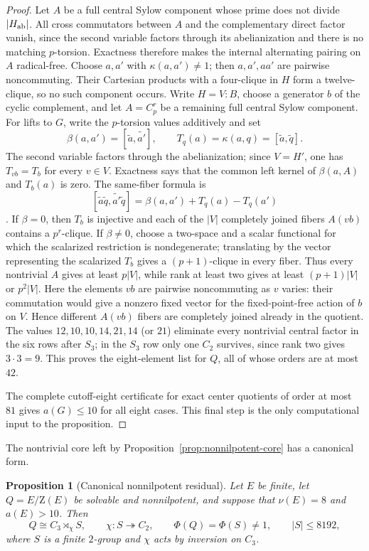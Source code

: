 \documentclass[11pt]{article}
\newtheorem{proposition}[theorem]{Proposition}
\theoremstyle{remark}
\newcommand{\nuG}{\nu}
\newcommand{\aG}{a}
\newcommand{\Z}{\mathrm Z}
\begin{document}
\begin{proof}
Let $A$ be a full central Sylow component whose prime does not divide
$|H_{\rm ab}|$.  All cross commutators between $A$ and the complementary
direct factor vanish, since the second variable factors through its
abelianization and there is no matching $p$-torsion.  Exactness therefore
makes the internal alternating pairing on $A$ radical-free.  Choose
$a,a'$ with $\kappa(a,a')\ne1$; then $a,a',aa'$ are pairwise noncommuting.
Their Cartesian products with a four-clique in $H$ form a twelve-clique,
so no such component occurs.
Write $H=V{:}B$, choose a generator $b$ of the cyclic complement, and let
$A=C_p^r$ be a remaining full central Sylow component.  For lifts to $G$,
write the $p$-torsion values additively and set
\[
 \beta(a,a')=[\widetilde a,\widetilde {a'}],
 \qquad T_q(a)=\kappa(a,q)=[\widetilde a,\widetilde q].
\]
The second variable factors through the abelianization; since $V=H'$, one
has $T_{vb}=T_b$ for every $v\in V$.  Exactness says that the common left
kernel of $\beta(a,A)$ and $T_b(a)$ is zero.  The same-fiber formula is
\[
 [\widetilde a\widetilde q,\widetilde {a'}\widetilde q]
 =\beta(a,a')+T_q(a)-T_q(a')
\].
If $\beta=0$, then $T_b$ is injective and each of the $|V|$ completely
joined fibers $A(vb)$ contains a $p^r$-clique.  If $\beta\ne0$, choose a
two-space and a scalar functional for which the scalarized restriction is
nondegenerate; translating by the vector representing the scalarized
$T_b$ gives a $(p+1)$-clique in every fiber.  Thus every nontrivial $A$
gives at least $p|V|$, while rank at least two gives at least
$(p+1)|V|$ or $p^2|V|$.
Here the elements $vb$ are pairwise noncommuting as $v$ varies: their
commutation would give a nonzero fixed vector for the fixed-point-free
action of $b$ on $V$.  Hence different $A(vb)$ fibers are completely joined
already in the quotient.
The values $12,10,10,14,21,14$ (or $21$) eliminate every nontrivial central
factor in the six rows after $S_3$; in the $S_3$ row only one $C_2$
survives, since rank two gives $3\cdot3=9$.  This proves the eight-element
list for $Q$, all of whose orders are at most $42$.

The complete cutoff-eight certificate for exact center quotients of order
at most $81$ gives $\aG(G)\le10$ for all eight cases.  This final step is the
only computational input to the proposition.
\end{proof}

The nontrivial core left by Proposition~\ref{prop:nonnilpotent-core} has a
canonical form.

\begin{proposition}[Canonical nonnilpotent residual]
\label{prop:nonnilpotent-semidir}
Let $E$ be finite, let $Q=E/\Z(E)$ be solvable and nonnilpotent, and suppose
that $\nuG(E)=8$ and $\aG(E)>10$.  Then
\begin{equation}
 Q\cong C_3\rtimes_\chi S,\qquad
 \chi:S\twoheadrightarrow C_2,\qquad
 \Phi(Q)=\Phi(S)\ne1,\qquad |S|\le8192,
\label{eq:canonical-semidir}
\end{equation}
where $S$ is a finite $2$-group and $\chi$ acts by inversion on $C_3$.
\end{proposition}
\end{document}
